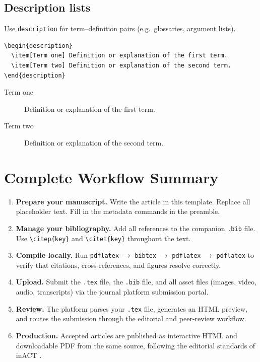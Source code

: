 \subsection{Description lists}

Use \texttt{description} for term--definition pairs (e.g.\ glossaries,
argument lists).

\begin{verbatim}
\begin{description}
  \item[Term one] Definition or explanation of the first term.
  \item[Term two] Definition or explanation of the second term.
\end{description}
\end{verbatim}

\begin{description}
  \item[Term one] Definition or explanation of the first term.
  \item[Term two] Definition or explanation of the second term.
\end{description}

\section{Complete Workflow Summary}

\begin{enumerate}
  \item \textbf{Prepare your manuscript.} Write the article in this
    template. Replace all placeholder text. Fill in the metadata
    commands in the preamble.

  \item \textbf{Manage your bibliography.} Add all references to the
    companion \texttt{.bib} file. Use \verb|\citep{key}| and
    \verb|\citet{key}| throughout the text.

  \item \textbf{Compile locally.} Run \texttt{pdflatex} $\to$
    \texttt{bibtex} $\to$ \texttt{pdflatex} $\to$ \texttt{pdflatex}
    to verify that citations, cross-references, and figures resolve
    correctly.

  \item \textbf{Upload.} Submit the \texttt{.tex} file, the \texttt{.bib}
    file, and all asset files (images, video, audio, transcripts) via
    the journal platform submission portal.

  \item \textbf{Review.} The platform parses your \texttt{.tex} file,
    generates an HTML preview, and routes the submission through the
    editorial and peer-review workflow.

  \item \textbf{Production.} Accepted articles are published as
    interactive HTML and downloadable PDF from the same source,
    following the editorial standards of inACT
    \citep{journalwebsite}.
\end{enumerate}

